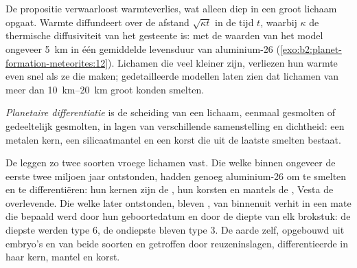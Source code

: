 \begin{omfigure}
\par{}
\end{omfigure}

De propositie verwaarloost warmteverlies, wat alleen diep in een groot lichaam opgaat.
Warmte diffundeert over de afstand $\sqrt{\kappa t}$ in de tijd $t$, waarbij
$\kappa$ de thermische diffusiviteit van het gesteente is: met de waarden van het model
ongeveer \qty{5}{km} in één gemiddelde levensduur van aluminium-26 (\cref{exo:b2:planet-formation-meteorites:12}). Lichamen die veel
kleiner zijn, verliezen hun warmte even snel als ze die maken; gedetailleerde modellen laten zien
dat lichamen van meer dan \qtyrange{10}{20}{km} groot konden smelten.

\begin{definition}
\label{def:b2:planet-formation-meteorites:differentiation}
\emph{Planetaire differentiatie} is de
scheiding van een lichaam, eenmaal gesmolten of gedeeltelijk gesmolten, in lagen van verschillende
samenstelling en dichtheid: een metalen kern, een silicaatmantel en een korst die uit
de laatste smelten bestaat.
\end{definition}

De  leggen zo twee soorten vroege lichamen vast. Die welke binnen
ongeveer de eerste twee miljoen jaar ontstonden, hadden genoeg aluminium-26 om te smelten en
te differentiëren: hun kernen zijn de , hun korsten en mantels
de , Vesta de overlevende. Die welke later ontstonden, bleven
, van binnenuit verhit in een mate die bepaald werd door hun geboortedatum en door
de diepte van elk brokstuk: de diepste werden type 6, de ondiepste bleven
type 3. De aarde zelf, opgebouwd uit embryo's en  van beide soorten en
getroffen door reuzeninslagen, differentieerde in haar kern, mantel en korst.

